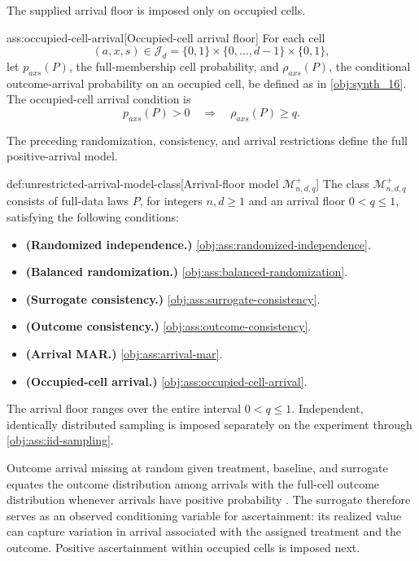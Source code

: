 \documentclass[11pt]{article}
\begin{document}
The supplied arrival floor is imposed only on occupied cells.

\begin{assumptionv}{ass:occupied-cell-arrival}[Occupied-cell arrival floor]
For each cell
\[
(a,x,s)\in\mathcal J_d
=\{0,1\}\times\{0,\ldots,d-1\}\times\{0,1\},
\]
let \(p_{axs}(P)\), the full-membership cell probability, and \(\rho_{axs}(P)\), the conditional outcome-arrival probability on an occupied cell, be defined as in \cref{obj:synth_16}. The occupied-cell arrival condition is
\[
p_{axs}(P)>0
\quad\Longrightarrow\quad
\rho_{axs}(P)\ge q.
\]
\end{assumptionv}

The preceding randomization, consistency, and arrival restrictions define the full positive-arrival model.

\begin{definitionv}{def:unrestricted-arrival-model-class}[Arrival-floor model \(\mathcal M^{+}_{n,d,q}\)]
The class \(\mathcal M^{+}_{n,d,q}\) consists of full-data laws \(P\), for integers \(n,d\ge1\) and an arrival floor \(0<q\le1\), satisfying the following conditions:
\begin{itemize}
\item \textbf{(Randomized independence.)} \cref{obj:ass:randomized-independence}.
\item \textbf{(Balanced randomization.)} \cref{obj:ass:balanced-randomization}.
\item \textbf{(Surrogate consistency.)} \cref{obj:ass:surrogate-consistency}.
\item \textbf{(Outcome consistency.)} \cref{obj:ass:outcome-consistency}.
\item \textbf{(Arrival MAR.)} \cref{obj:ass:arrival-mar}.
\item \textbf{(Occupied-cell arrival.)} \cref{obj:ass:occupied-cell-arrival}.
\end{itemize}
The arrival floor ranges over the entire interval \(0<q\le1\). Independent, identically distributed sampling is imposed separately on the experiment through \cref{obj:ass:iid-sampling}.
\end{definitionv}

Outcome arrival missing at random given treatment, baseline, and surrogate equates the outcome distribution among arrivals with the full-cell outcome distribution whenever arrivals have positive probability \citep{Rubin1976,Robins1994,KallusMao2025}. The surrogate therefore serves as an observed conditioning variable for ascertainment: its realized value can capture variation in arrival associated with the assigned treatment and the outcome. Positive ascertainment within occupied cells is imposed next.
\end{document}
